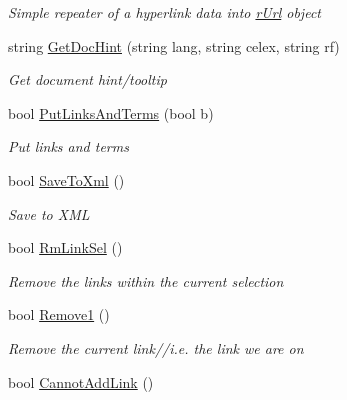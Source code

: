 \begin{DoxyCompactItemize}
\begin{DoxyCompactList}\small\item\em Simple repeater of a hyperlink data into \hyperlink{class_e_u_cases_1_1_e_u_links_checker_word_add_in_1_1_e_u_links_checker_add_in_1_1r_url}{r\+Url} object \end{DoxyCompactList}\item 
string \hyperlink{class_e_u_cases_1_1_e_u_links_checker_word_add_in_1_1_e_u_links_checker_add_in_a46f3eb216b86e85ce63be973c1c61f14}{Get\+Doc\+Hint} (string lang, string celex, string rf)
\begin{DoxyCompactList}\small\item\em Get document hint/tooltip \end{DoxyCompactList}\item 
bool \hyperlink{class_e_u_cases_1_1_e_u_links_checker_word_add_in_1_1_e_u_links_checker_add_in_af91b4485d769aafdbe14c84db2ffd1dd}{Put\+Links\+And\+Terms} (bool b)
\begin{DoxyCompactList}\small\item\em Put links and terms \end{DoxyCompactList}\item 
bool \hyperlink{class_e_u_cases_1_1_e_u_links_checker_word_add_in_1_1_e_u_links_checker_add_in_a612e25aee84a4e45cbdd57da21dc033a}{Save\+To\+Xml} ()
\begin{DoxyCompactList}\small\item\em Save to X\+M\+L \end{DoxyCompactList}\item 
bool \hyperlink{class_e_u_cases_1_1_e_u_links_checker_word_add_in_1_1_e_u_links_checker_add_in_a541729e05d545b9403ad5e2d41356da4}{Rm\+Link\+Sel} ()
\begin{DoxyCompactList}\small\item\em Remove the links within the current selection \end{DoxyCompactList}\item 
bool \hyperlink{class_e_u_cases_1_1_e_u_links_checker_word_add_in_1_1_e_u_links_checker_add_in_ab6a7062effff2a4253ab08308e00ed3c}{Remove1} ()
\begin{DoxyCompactList}\small\item\em Remove the current link//i.e. the link we are on \end{DoxyCompactList}\item 
bool \hyperlink{class_e_u_cases_1_1_e_u_links_checker_word_add_in_1_1_e_u_links_checker_add_in_a9a75fe5ecf456b5ca741b87b6ce79e26}{Cannot\+Add\+Link} ()

\end{DoxyCompactItemize}
